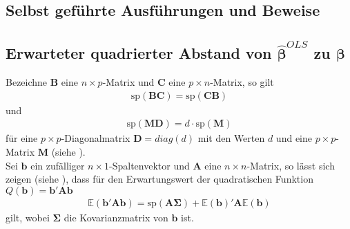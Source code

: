 \documentclass[12pt, a4paper]{report}\usepackage[]{graphicx}\usepackage[]{color}
\begin{document}
\begin{appendix}
\chapter{Selbst geführte Ausführungen und Beweise}
\section{Erwarteter quadrierter Abstand von $\boldsymbol{\hat{\beta}}^{OLS}$ zu $\boldsymbol{\beta}$}\label{App_Beweis_Erwarteter_quadrierter_Abstand}
Bezeichne $\mathbf{B}$ eine $n \times p$-Matrix und $\mathbf{C}$ eine $p \times n$-Matrix, so gilt
\begin{align}\label{Eq_Spurgleichheit}
\text{sp}(\mathbf{BC})=\text{sp}(\mathbf{CB})
\end{align}
und
\begin{align}\label{Eq_Spurmultiplikation}
\text{sp}(\mathbf{M}\mathbf{D})=d \cdot \text{sp}(\mathbf{M})
\end{align}
für eine $p \times p$-Diagonalmatrix $\mathbf{D}=diag(d)$ mit den Werten $d$ und eine $p \times p$-Matrix $\mathbf{M}$ (siehe \cite{fahrmeir2009regression}).\\

Sei $\mathbf{b}$ ein zufälliger $n \times 1$-Spaltenvektor und $\mathbf{A}$ eine $n \times n$-Matrix, so lässt sich zeigen (siehe \cite{mathai1992quadratic}), dass für den Erwartungswert der quadratischen Funktion $Q(\mathbf{b})=\mathbf{b}'\mathbf{A}\mathbf{b}$
\begin{align}\label{Eq_Erwartung_Quadrat}
\mathbb{E}(\mathbf{b}'\mathbf{A}\mathbf{b})=\text{sp}(\mathbf{A}\boldsymbol{\Sigma})+\mathbb{E}(\mathbf{b})'\mathbf{A}\mathbb{E}(\mathbf{b})
\end{align}
gilt, wobei $\boldsymbol{\Sigma}$ die Kovarianzmatrix von $\mathbf{b}$ ist.\\


\end{appendix}
\end{document}
